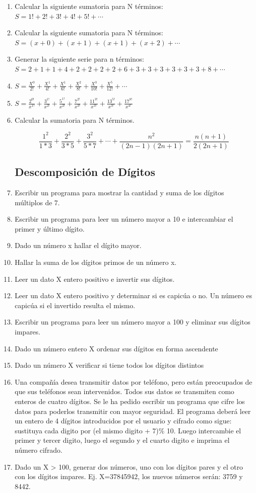 \documentclass{scrartcl}
\begin{document}
\begin{enumerate}
		\item Calcular la siguiente sumatoria para N
		términos: $S=1! +2! +3! +4! +5! +\cdots$
		\item Calcular la siguiente sumatoria para N
		términos: $S=(x+0)+(x+1)+(x+1)+(x+2)+\cdots$
		\item Generar la siguiente serie para n términos:
		$S=2+1+1+ 4+ 2+ 2+ 2+ 2+ 6+3+3+3+3+3+3+8+\cdots$
		\item $S=\frac{X^{0}}{2!}+\frac{X^{1}}{4!}+\frac{X^{1}}{6!}+\frac{X^{2}}{8!}+\frac{X^{3}}{10!}+\frac{X^{5}}{12!}+\cdots$
		\item $S=\frac{2^{0!}}{x^{1!}}+\frac{3^{1!}}{x^{2!}}+\frac{5^{1!}}{x^{2!}}+\frac{7^{2!}}{x^{3!}}+\frac{11^{3!}}{x^{3!}}+\frac{13^{5!}}{x^{3!}}+\frac{17^{8!}}{x^{4!}}$
		\item Calcular la sumatoria para N términos.
		
		$$\frac{1^2}{1*3}+\frac{2^2}{3*5}+\frac{3^2}{5*7}+\cdots+\frac{n^2}{(2n-1)(2n+1)}=\frac{n(n+1)}{2(2n+1)}$$
		
		\subsection{Descomposición de Dígitos}
		
		\item Escribir un programa para mostrar la cantidad y suma de los dígitos múltiplos de 7.
		\item Escribir un programa para leer un número mayor a 10 e intercambiar el primer y último dígito.
		\item Dado un número x hallar el dígito mayor.
		\item Hallar la suma de los dígitos primos de un número x.
		\item Leer un dato X entero positivo e invertir sus dígitos.
		\item Leer un dato X entero positivo y determinar si es capicúa o no. Un número es capicúa si el invertido resulta el mismo.
		\item Escribir un programa para leer un número mayor a 100 y eliminar sus dígitos impares.
		\item Dado un número entero X ordenar sus dígitos en forma ascendente
		\item Dado un número X verificar si tiene todos los dígitos distintos
		\item Una compañía desea transmitir datos por teléfono, pero están preocupados de que sus teléfonos sean intervenidos. Todos sus datos se transmiten como enteros de cuatro dígitos. Se le ha pedido escribir un programa que cifre los datos para poderlos transmitir con mayor seguridad. El programa deberá leer un entero de 4 dígitos	introducidos por el usuario y cifrado como sigue: sustituya cada digito por (el mismo digito + 7)\% 10. Luego intercambie el primer y tercer digito, luego el segundo y el cuarto digito e imprima el número cifrado.
		
		\item Dado un X > 100, generar dos números, uno con los dígitos pares y el otro con los dígitos impares. Ej. X=37845942, los nuevos números serán: 3759 y 8442.
	\end{enumerate}
\end{document}
